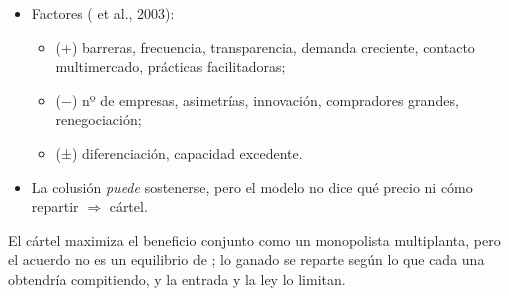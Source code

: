 \documentclass{article}
\begin{document}
\begin{columnas}
\begin{itemize}
\item Factores ( et al., 2003):
  \begin{itemize}
  \item (+) barreras, frecuencia, transparencia, demanda creciente, contacto multimercado, prácticas facilitadoras;
  \item ($-$) nº de empresas, asimetrías, innovación, compradores grandes, renegociación;
  \item (±) diferenciación, capacidad excedente.
  \end{itemize}
\item La colusión \emph{puede} sostenerse, pero el modelo no dice qué precio ni cómo repartir $\Rightarrow$ cártel.
\end{itemize}

\begin{ideaclave}
El cártel maximiza el beneficio conjunto como un monopolista multiplanta, pero el acuerdo no es un equilibrio de ; lo ganado se reparte según lo que cada una obtendría compitiendo, y la entrada y la ley lo limitan.
\end{ideaclave}


\end{columnas}
\end{document}
